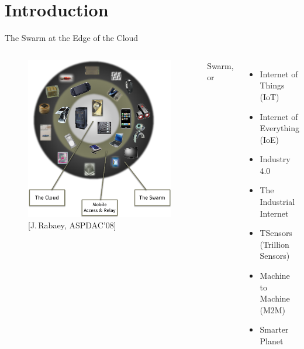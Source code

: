 \section{Introduction}

\begin{frame}{The Swarm at the Edge of the Cloud}
  \pause

  \begin{columns}
    \begin{figure}
      \includegraphics[width=\textwidth]{figures/swarm_jan.pdf}
      \caption{[J.\,Rabaey, ASPDAC'08]}
    \end{figure}

    \pause

    Swarm, or
    \begin{itemize}
    \item Internet of Things (IoT)
    \item Internet of Everything (IoE)
    \item Industry 4.0
    \item The Industrial Internet
    \item TSensors (Trillion Sensors)
    \item Machine to Machine (M2M)
    \item Smarter Planet
    \end{itemize}
  \end{columns}
\end{frame}

